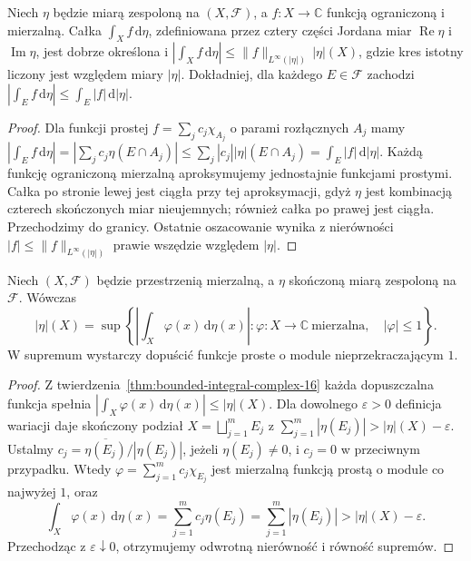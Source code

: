 \begin{twierdzenie}
\label{thm:bounded-integral-complex-16}
Niech $\eta$ będzie miarą zespoloną na $(X,\mathcal F)$,
a $f:X\to\mathbb C$ funkcją ograniczoną i mierzalną.
Całka $\int_Xf\,\mathrm d\eta$, zdefiniowana przez
cztery części Jordana miar
$\operatorname{Re}\eta$ i $\operatorname{Im}\eta$, jest dobrze
określona i
$|\int_Xf\,\mathrm d\eta|\le\|f\|_{L^\infty(|\eta|)}\,|\eta|(X)$,
gdzie kres istotny liczony jest względem miary $|\eta|$.
Dokładniej, dla każdego $E\in\mathcal F$ zachodzi
$|\int_Ef\,\mathrm d\eta|\le\int_E|f|\,\mathrm d|\eta|$.
\end{twierdzenie}
\begin{proof}
Dla funkcji prostej $f=\sum_jc_j\chi_{A_j}$
o parami rozłącznych $A_j$ mamy
$|\int_Ef\,\mathrm d\eta|
=|\sum_jc_j\eta(E\cap A_j)|
\le\sum_j|c_j||\eta|(E\cap A_j)
=\int_E|f|\,\mathrm d|\eta|$.
Każdą funkcję ograniczoną mierzalną aproksymujemy
jednostajnie funkcjami prostymi. Całka po stronie
lewej jest ciągła przy tej aproksymacji, gdyż
$\eta$ jest kombinacją czterech skończonych miar
nieujemnych; również całka po prawej jest ciągła.
Przechodzimy do granicy. Ostatnie oszacowanie wynika z nierówności
$|f|\le\|f\|_{L^\infty(|\eta|)}$ prawie wszędzie
względem $|\eta|$.
\end{proof}

\begin{twierdzenie}
\label{thm:tv-dual-tests-16}
Niech $(X,\mathcal F)$ będzie przestrzenią mierzalną,
a $\eta$ skończoną miarą zespoloną na $\mathcal F$.
Wówczas
\begin{equation}\label{eq:tv-dual-tests-16}
 |\eta|(X)=\sup\left\{\left|\int_X \varphi(x)\,\mathrm d\eta(x)\right|:
 \varphi:X\to\mathbb C\ \text{mierzalna},\quad |\varphi|\le1\right\}.
\end{equation}
W supremum wystarczy dopuścić funkcje proste o module
nieprzekraczającym $1$.
\end{twierdzenie}
\begin{proof}
Z twierdzenia~\ref{thm:bounded-integral-complex-16}
każda dopuszczalna funkcja spełnia
$|\int_X\varphi(x)\,\mathrm d\eta(x)|\le|\eta|(X)$.
Dla dowolnego $\varepsilon>0$ definicja wariacji daje
skończony podział $X=\bigsqcup_{j=1}^mE_j$ z
$\sum_{j=1}^m|\eta(E_j)|>|\eta|(X)-\varepsilon$.
Ustalmy
$c_j=\overline{\eta(E_j)}/|\eta(E_j)|$, jeżeli
$\eta(E_j)\neq0$, i $c_j=0$ w przeciwnym przypadku.
Wtedy $\varphi=\sum_{j=1}^mc_j\chi_{E_j}$ jest
mierzalną funkcją prostą o module co najwyżej $1$, oraz
\[
 \int_X\varphi(x)\,\mathrm d\eta(x)
 =\sum_{j=1}^mc_j\eta(E_j)
 =\sum_{j=1}^m|\eta(E_j)|>|\eta|(X)-\varepsilon.
\]
Przechodząc z $\varepsilon\downarrow0$, otrzymujemy
odwrotną nierówność i równość supremów.
\end{proof}


